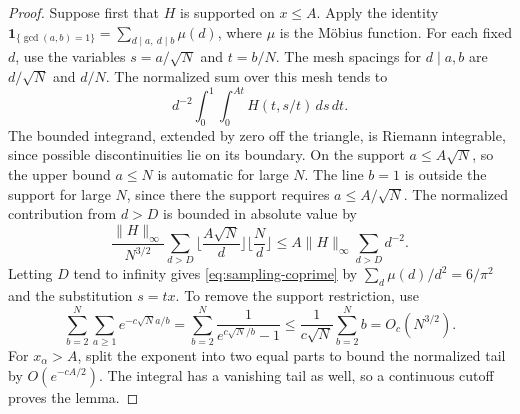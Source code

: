 \documentclass[11pt]{amsart}
\theoremstyle{remark}
\begin{document}
\begin{proof}
Suppose first that \(H\) is supported on \(x\le A\). Apply the identity
\(\mathbf 1_{\{\gcd(a,b)=1\}}=\sum_{d\mid a,\ d\mid b}\mu(d)\), where \(\mu\)
is the M\"obius function. For each fixed \(d\), use the variables
\(s=a/\sqrt N\) and \(t=b/N\). The mesh spacings for \(d\mid a,b\) are
\(d/\sqrt N\) and \(d/N\). The normalized sum over this mesh tends to
\[
 d^{-2}\int_0^1\int_0^{At} H(t,s/t)\,ds\,dt.
\]
The bounded integrand, extended by zero off the triangle, is Riemann
integrable, since possible discontinuities lie on its boundary. On the
support \(a\le A\sqrt N\), so the upper bound \(a\le N\) is automatic for
large \(N\). The line \(b=1\) is outside the support for large \(N\), since there
the support requires \(a\le A/\sqrt N\). The normalized contribution from \(d>D\) is bounded in absolute value
by
\[
 \frac{\|H\|_\infty}{N^{3/2}}
 \sum_{d>D}\Big\lfloor\frac{A\sqrt N}{d}\Big\rfloor
            \Big\lfloor\frac{N}{d}\Big\rfloor
 \le A\|H\|_\infty\sum_{d>D}d^{-2}.
\]
Letting \(D\) tend to infinity gives \eqref{eq:sampling-coprime} by
\(\sum_d\mu(d)/d^2=6/\pi^2\) and the substitution \(s=tx\).
To remove the support restriction, use
\[
 \sum_{b=2}^N\sum_{a\ge1}e^{-c\sqrt N a/b}
 =\sum_{b=2}^N\frac{1}{e^{c\sqrt N/b}-1}
 \le\frac{1}{c\sqrt N}\sum_{b=2}^N b=O_c(N^{3/2}).
\]
For \(x_\alpha>A\), split the exponent into two equal parts to bound the
normalized tail by \(O(e^{-cA/2})\). The integral has a vanishing tail as
well, so a continuous cutoff proves the lemma.
\end{proof}
\end{document}
